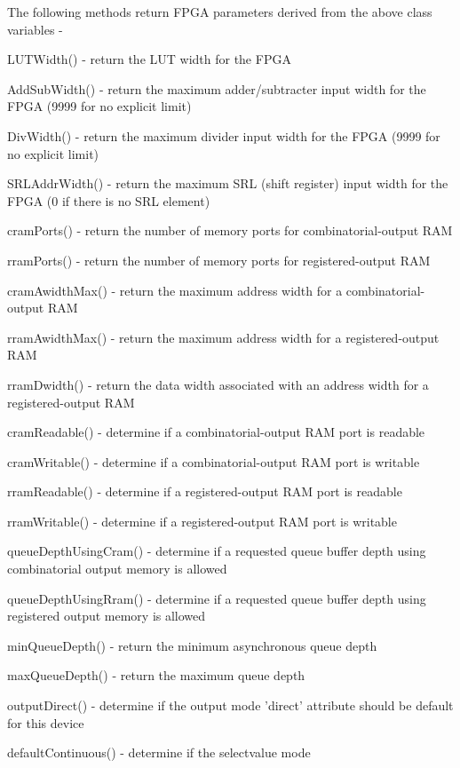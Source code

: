 The following methods return FPGA parameters derived from the above class
variables -
\blist
\item   LUTWidth() - return the LUT width for the FPGA
\item   AddSubWidth() - return the maximum adder/subtracter input
        width for the FPGA (9999 for no explicit limit)
\item   DivWidth() - return the maximum divider input width
        for the FPGA (9999 for no explicit limit)
\item   SRLAddrWidth() - return the maximum SRL (shift register)
        input width for the FPGA (0 if there is no SRL element)
\item   cramPorts() - return the number of memory ports for
        combinatorial-output RAM
\item   rramPorts() - return the number of memory ports for
        registered-output RAM
\item   cramAwidthMax() - return the maximum address width for a
        combinatorial-output RAM
\item   rramAwidthMax() - return the maximum address width for a
        registered-output RAM
\item   rramDwidth() - return the data width associated with an address
        width for a registered-output RAM
\item   cramReadable() - determine if a combinatorial-output RAM port is
        readable
\item   cramWritable() - determine if a combinatorial-output RAM port is
        writable
\item   rramReadable() - determine if a registered-output RAM port is
        readable
\item   rramWritable() - determine if a registered-output RAM port is
        writable
\item   queueDepthUsingCram() - determine if a requested queue buffer
        depth using combinatorial output memory is allowed
\item   queueDepthUsingRram() - determine if a requested queue buffer
        depth using registered output memory is allowed
\item   minQueueDepth() - return the minimum asynchronous queue depth
\item   maxQueueDepth() - return the maximum queue depth
\item   outputDirect() - determine if the output mode 'direct' attribute
        should be default for this device
\item   defaultContinuous() - determine if the selectvalue mode

